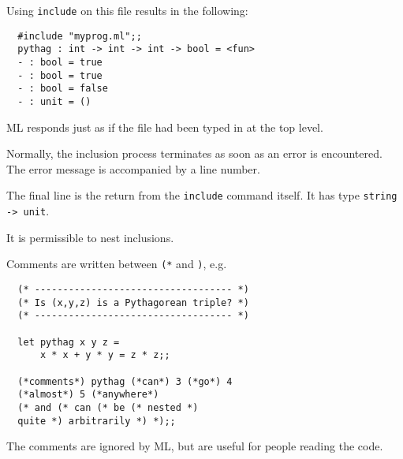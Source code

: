 \begin{slide*}


\vspace*{0.5cm}

Using {\black \tt include} on this file results in the following:

\begin{black}\begin{verbatim}
  #include "myprog.ml";;
  pythag : int -> int -> int -> bool = <fun>
  - : bool = true
  - : bool = true
  - : bool = false
  - : unit = ()
\end{verbatim}\end{black}

ML responds just as if the file had been typed in at the top level.

Normally, the inclusion process terminates as soon as an error is encountered.
The error message is accompanied by a line number.

The final line is the return from the {\black \tt include} command itself. It
has type {\black \tt string -> unit}.

It is permissible to nest inclusions.

\end{slide*}



\begin{slide*}


\vspace*{0.5cm}

Comments are written between {\black \tt (*} and {\black \tt *)}, e.g.

\begin{black}\begin{verbatim}
  (* ----------------------------------- *)
  (* Is (x,y,z) is a Pythagorean triple? *)
  (* ----------------------------------- *)

  let pythag x y z =
      x * x + y * y = z * z;;

  (*comments*) pythag (*can*) 3 (*go*) 4
  (*almost*) 5 (*anywhere*)
  (* and (* can (* be (* nested *)
  quite *) arbitrarily *) *);;
\end{verbatim}\end{black}

The comments are ignored by ML, but are useful for people reading the code.

\end{slide*}




